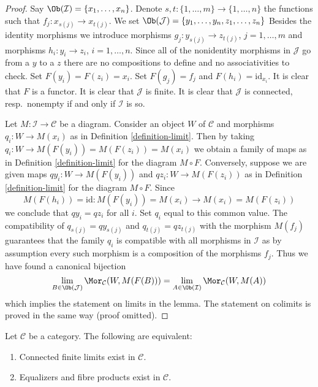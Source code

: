 \begin{proof}
Say $\Ob(\mathcal{I}) = \{x_1, \ldots, x_n\}$.
Denote $s, t : \{1, \ldots, m\} \to \{1, \ldots, n\}$ the functions
such that $f_j : x_{s(j)} \to x_{t(j)}$.
We set $\Ob(\mathcal{J}) = \{y_1, \ldots, y_n, z_1, \ldots, z_n\}$
Besides the identity morphisms we introduce morphisms
$g_j : y_{s(j)} \to z_{t(j)}$, $j = 1, \ldots, m$ and morphisms
$h_i : y_i \to z_i$, $i = 1, \ldots, n$. Since all of the nonidentity
morphisms in $\mathcal{J}$ go from a $y$ to a $z$ there are no
compositions to define and no associativities to check.
Set $F(y_i) = F(z_i) = x_i$. Set $F(g_j) = f_j$ and $F(h_i) = \text{id}_{x_i}$.
It is clear that $F$ is a functor.
It is clear that $\mathcal{J}$ is finite.
It is clear that $\mathcal{J}$ is connected, resp.\ nonempty
if and only if $\mathcal{I}$ is so.

\medskip\noindent
Let $M : \mathcal{I} \to \mathcal{C}$ be a diagram.
Consider an object $W$ of $\mathcal{C}$ and morphisms
$q_i : W \to M(x_i)$ as in
Definition \ref{definition-limit}.
Then by taking $q_i : W \to M(F(y_i)) = M(F(z_i)) = M(x_i)$ we obtain
a family of maps as in
Definition \ref{definition-limit}
for the diagram $M \circ F$.
Conversely, suppose we are given maps
$qy_i : W \to M(F(y_i))$ and $qz_i : W \to M(F(z_i))$
as in
Definition \ref{definition-limit}
for the diagram $M \circ F$. Since
$$
M(F(h_i)) = \text{id} : M(F(y_i)) = M(x_i) \longrightarrow M(x_i) = M(F(z_i))
$$
we conclude that $qy_i = qz_i$ for all $i$. Set $q_i$ equal to this common
value. The compatibility of
$q_{s(j)} = qy_{s(j)}$ and $q_{t(j)} = qz_{t(j)}$ with the morphism
$M(f_j)$ guarantees that the family $q_i$ is compatible with all morphisms
in $\mathcal{I}$ as by assumption every such morphism is a composition
of the morphisms $f_j$. Thus we have found a canonical bijection
$$
\lim_{B \in \Ob(\mathcal{J})} \Mor_\mathcal{C}(W, M(F(B)))
=
\lim_{A \in \Ob(\mathcal{I})} \Mor_\mathcal{C}(W, M(A))
$$
which implies the statement on limits in the lemma. The statement on colimits
is proved in the same way (proof omitted).
\end{proof}

\begin{lemma}
\label{lemma-fibre-products-equalizers-exist}
Let $\mathcal{C}$ be a category.
The following are equivalent:
\begin{enumerate}
\item Connected finite limits exist in $\mathcal{C}$.
\item Equalizers and fibre products exist in $\mathcal{C}$.
\end{enumerate}
\end{lemma}

